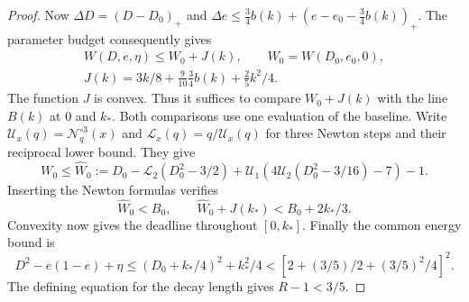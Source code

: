 \begin{proof}
Now $\Delta D=(D-D_0)_+$ and
$\Delta e\le\tfrac34b( k)+(e-e_0-\tfrac34b( k))_+$.
The parameter budget consequently gives
\[
\begin{gathered}
 W(D,e,\eta)\le W_0+J( k),\qquad W_0=W(D_0,e_0,0),\\
 J( k)=3 k/8+\tfrac9{10}\tfrac34b( k)+\tfrac25 k^2/4.
\end{gathered}
\]
The function $J$ is convex. Thus it suffices to compare
$W_0+J( k)$ with the line $B( k)$ at $0$ and $ k_*$.
Both comparisons use one evaluation of the baseline.
Write $\mathcal U_x(q)=\mathcal N_q^{\circ3}(x)$ and
$\mathcal L_x(q)=q/\mathcal U_x(q)$ for three Newton steps and
 their reciprocal lower bound. They give
\begin{equation}\label{eq:partial-newton-duration}
 W_0\le\widehat W_0
 :=D_0-\mathcal L_2(D_0^2-3/2)
   +\mathcal U_1(4\mathcal U_2(D_0^2-3/16)-7)-1.
\end{equation}
Inserting the Newton formulas verifies
\[
 \widehat W_0<B_0,\qquad
 \widehat W_0+J( k_*)<B_0+2 k_*/3.
\]
Convexity now gives the deadline throughout $[0, k_*]$.
Finally the common energy bound is
\[
 D^2-e(1-e)+\eta
 \le(D_0+ k_*/4)^2+ k_*^2/4
 <[2+(3/5)/2+(3/5)^2/4]^2.
\]
The defining equation for the decay length gives $R-1<3/5$.
\end{proof}

